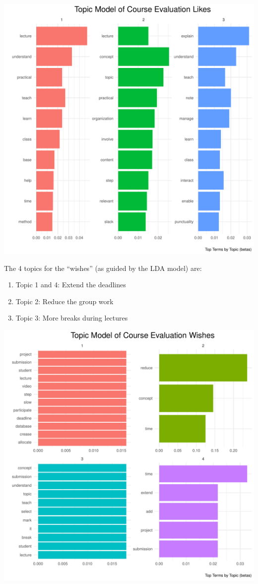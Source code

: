 \documentclass[
]{article}
\begin{document}
\includegraphics{Mid-SemesterCourseEvaluation-20240819-20241125-ADB-BBIT2.2_files/figure-latex/visualizations_for_likes_topic_modelling-1.pdf}

\newpage

The 4 topics for the ``wishes'' (as guided by the LDA model) are:

\begin{enumerate}
\def\labelenumi{\arabic{enumi}.}
\item
  Topic 1 and 4: Extend the deadlines
\item
  Topic 2: Reduce the group work
\item
  Topic 3: More breaks during lectures
\end{enumerate}

\includegraphics{Mid-SemesterCourseEvaluation-20240819-20241125-ADB-BBIT2.2_files/figure-latex/visualizations_for_wishes_topic_modelling-1.pdf}
\end{document}
